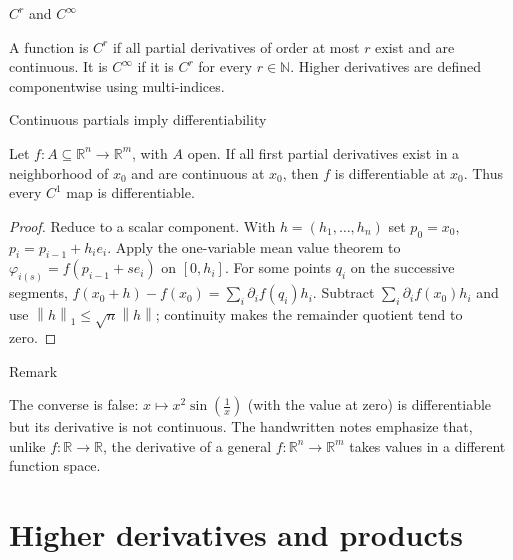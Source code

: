 \begin{definition}{\(C^{r}\) and \(C^{\infty}\)}

A function is \(C^{r}\) if all partial derivatives of order at most \(r\) exist and are continuous. It is \(C^{\infty}\) if it is \(C^{r}\) for every \(r \in \mathbb{N}\). Higher derivatives are defined componentwise using multi-indices.

\end{definition}

\begin{theorem}{Continuous partials imply differentiability}

Let \(f:A \subseteq \mathbb{R}^{n}\rightarrow\mathbb{R}^{m}\), with \(A\) open. If all first partial derivatives exist in a neighborhood of \(x_{0}\) and are continuous at \(x_{0}\), then \(f\) is differentiable at \(x_{0}\). Thus every \(C^{1}\) map is differentiable.

\end{theorem}

\begin{proof}

Reduce to a scalar component. With \(h = \left( {h_{1},\ldots,h_{n}} \right)\) set \(p_{0} = x_{0}\), \(p_{i} = p_{i - 1} + h_{i}e_{i}\). Apply the one-variable mean value theorem to \(\varphi_{i{(s)}} = f\left( {p_{i - 1} + se_{i}} \right)\) on \(\left\lbrack {0,h_{i}} \right\rbrack\). For some points \(q_{i}\) on the successive segments, \(f\left( {x_{0} + h} \right) - f\left( x_{0} \right) = \sum_{i}\partial_{i}f\left( q_{i} \right)h_{i}\). Subtract \(\sum_{i}\partial_{i}f\left( x_{0} \right)h_{i}\) and use \(\left\| h \right\|_{1} \leq \sqrt{n}\left\| h \right\|\); continuity makes the remainder quotient tend to zero.

\end{proof}

\begin{qlremark}{Remark}

The converse is false: \(x\mapsto x^{2}\sin\left( \frac{1}{x} \right)\) (with the value at zero) is differentiable but its derivative is not continuous. The handwritten notes emphasize that, unlike \(f:\mathbb{R}\rightarrow\mathbb{R}\), the derivative of a general \(f:\mathbb{R}^{n}\rightarrow\mathbb{R}^{m}\) takes values in a different function space.

\end{qlremark}

\section{Higher derivatives and products}

